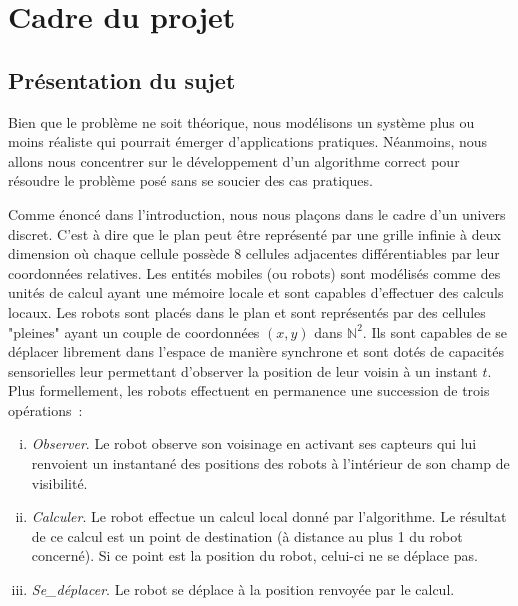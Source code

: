 \newcommand{\Observer}{\textit{Observer}\xspace}
\newcommand{\Calculer}{\textit{Calculer}\xspace}
\newcommand{\SeDeplacer}{\textit{Se\_déplacer}\xspace}

\newcommand{\outil}[1]{\textit{#1}\xspace}

\section{Cadre du projet}

\subsection{Présentation du sujet}

Bien que le problème ne soit théorique, nous modélisons un système plus ou
moins réaliste qui pourrait émerger d'applications pratiques. Néanmoins, nous
allons nous concentrer sur le développement d'un algorithme correct pour
résoudre le problème posé sans se soucier des cas pratiques.

Comme énoncé dans l'introduction, nous nous plaçons dans le cadre d'un univers
discret. C'est à dire que le plan peut être représenté par une grille infinie à
deux dimension où chaque cellule possède 8 cellules adjacentes différentiables
par leur coordonnées relatives. Les entités mobiles (ou robots) sont modélisés
comme des unités de calcul ayant une mémoire locale et sont capables
d'effectuer des calculs locaux. Les robots sont placés dans le plan et sont
représentés par des cellules "pleines" ayant un couple de coordonnées $(x,y)$
dans $\mathbb{N}^2$. Ils sont capables de se déplacer librement dans l'espace
de manière synchrone et sont dotés de capacités sensorielles leur permettant
d'observer la position de leur voisin à un instant $t$. Plus formellement, les
robots effectuent en permanence une succession de trois opérations~:
\begin{enumerate}[(i)]
  \item \Observer. Le robot observe son voisinage en activant ses capteurs qui
  lui renvoient un instantané des positions des robots à l'intérieur de son
  champ de visibilité.
  \item \Calculer. Le robot effectue un calcul local donné par l'algorithme. Le
  résultat de ce calcul est un point de destination (à distance au plus 1 du
  robot concerné). Si ce point est la position du robot, celui-ci ne se déplace
  pas.
  \item \SeDeplacer. Le robot se déplace à la position renvoyée par le calcul.
  \\
\end{enumerate}

